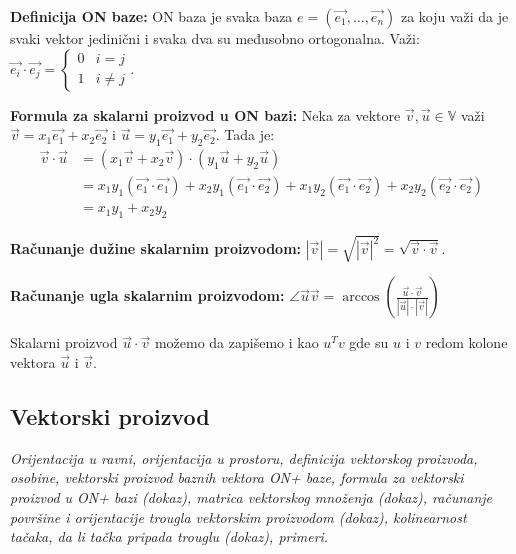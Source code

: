 \documentclass[12pt]{article}
\newcommand{\vek}[1]{\overrightarrow{#1}}
\begin{document}
\textbf{Definicija ON baze:} ON baza je svaka baza $e=(\vek{e_1},\dotsc,
    \vek{e_n})$ za koju važi da je svaki vektor jedinični i svaka dva su
međusobno ortogonalna. Važi: $\vek{e_i}\cdot\vek{e_j} =
    \begin{cases}
        0 & i=j     \\
        1 & i\neq j
    \end{cases}$.
\par

\textbf{Formula za skalarni proizvod u ON bazi:} Neka za vektore $\vek{v},
    \vek{u}\in\mathbb{V}$ važi $\vek{v}=x_1\vek{e_1}+x_2\vek{e_2}$ i
$\vek{u}=y_1\vek{e_1}+y_2\vek{e_2}$. Tada je:
\begin{align*}
    \vek{v}\cdot\vek{u} & = (x_1\vek{v}+x_2\vek{v})\cdot(y_1\vek{u}+y_2\vek{u})                                                                             \\
                        & = x_1y_1(\vek{e_1}\cdot\vek{e_1})+x_2y_1(\vek{e_1}\cdot\vek{e_2})+x_1y_2(\vek{e_1}\cdot\vek{e_2})+x_2y_2(\vek{e_2}\cdot\vek{e_2}) \\
                        & = x_1y_1+x_2y_2
\end{align*}
\par

\textbf{Računanje dužine skalarnim proizvodom:} $|\vek{v}|=\sqrt{|\vek{v}|^2}=
    \sqrt{\vek{v}\cdot\vek{v}}$.
\par

\textbf{Računanje ugla skalarnim proizvodom:} $\angle\vek{u}\vek{v}=
    \arccos(\frac{\vek{u}\cdot\vek{v}}{|\vek{u}|\cdot|\vek{v}|})$
\par

Skalarni proizvod $\vek{u}\cdot\vek{v}$ možemo da zapišemo i kao $u^Tv$ gde su
$u$ i $v$ redom kolone vektora $\vek{u}$ i $\vek{v}$.
\par

\subsection{Vektorski proizvod}
\textit{Orijentacija u ravni, orijentacija u prostoru, definicija vektorskog
    proizvoda, osobine, vektorski proizvod baznih vektora ON+ baze, formula za
    vektorski proizvod u ON+ bazi (dokaz), matrica vektorskog množenja (dokaz),
    računanje površine i orijentacije trougla vektorskim proizvodom (dokaz),
    kolinearnost tačaka, da li tačka pripada trouglu (dokaz), primeri.}
\par
\vspace*{1cm}
\end{document}
